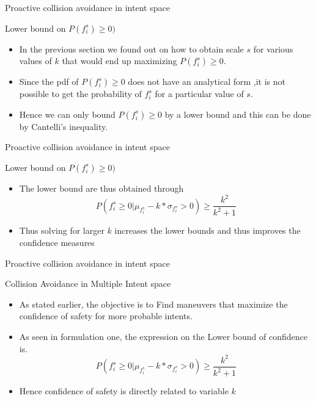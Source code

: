 \documentclass{beamer}
\begin{document}
\begin{frame}{Proactive collision avoidance in intent space}
\begin{block}{Lower bound on $P(f_i^s) \geq 0)$}

\begin{itemize}
\item{In the previous section we found out on how to obtain scale $s$ for various values of $k$ that would end up maximizing  $P(f_i^s) \geq 0$.}
\item{Since the pdf of $P(f_i^s) \geq 0$ does not have an analytical form ,it is not possible to get the probability of $f_i^s$ for a particular value of $s$.}
\item{Hence we can only bound $P(f_i^s) \geq 0$ by a lower bound and this can be done by Cantelli's inequality.}

\end{itemize}
\end{block}
\end{frame}
\begin{frame}{Proactive collision avoidance in intent space}
\begin{block}{Lower bound on $P(f_i^s) \geq 0)$}

\begin{itemize}
\item{The lower bound are thus obtained through}
$$P(f_i^s \geq 0 | \mu_{f_i^s} - k * \sigma_{f_i^s} > 0) \geq \frac{k^2}{k^2+1} $$
\item{Thus solving for larger $k$ increases the lower bounds and thus improves the confidence measures}
\end{itemize}
\end{block}
\end{frame}
\begin{frame}{Proactive collision avoidance in intent space}
\begin{block}{Collision Avoidance in Multiple Intent space }
\begin{itemize}
\item{As stated earlier, the objective is to 
Find maneuvers that maximize the confidence of 
safety for more probable intents.}
\item{As seen in formulation one, the expression on the
Lower bound of confidence is.}
$$P(f_i^s \geq 0 | \mu_{f_i^s} - k * \sigma_{f_i^s} > 0) \geq \frac{k^2}{k^2+1} $$
\item{Hence confidence of safety is directly related to variable $k$}
\end{itemize}
\end{block}
\end{frame}
\end{document}
